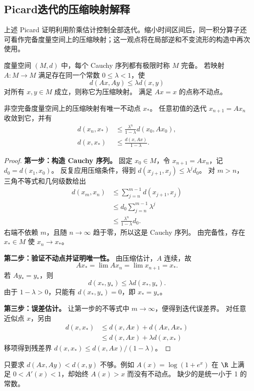 \subsection*{Picard迭代的压缩映射解释}
\label{sec:picard-contraction}
上述 Picard 证明利用阶乘估计控制全部迭代。缩小时间区间后，同一积分算子还可看作完备度量空间上的压缩映射；这一观点将在局部逆和不变流形的构造中再次使用。

\begin{definition}
度量空间 $(M,d)$ 中，每个 Cauchy 序列都有极限时称 $M$ 完备。
若映射 $A:M\to M$ 满足存在同一个常数 $0\leq\lambda<1$，使
\[
 d(Ax,Ay)\leq\lambda d(x,y)
\]
 对所有 $x,y\in M$ 成立，则称它为压缩映射。
满足 $Ax=x$ 的点称不动点。
\end{definition}
\begin{theorem}[压缩映射定理]\label{thm:arnold-banach}
非空完备度量空间上的压缩映射有唯一不动点 $x_*$。
任意初值的迭代 $x_{n+1}=Ax_n$ 收敛到它，并有
\[
 \begin{aligned}
 d(x_n,x_*)&\leq\frac{\lambda^n}{1-\lambda}d(x_0,Ax_0),\\
 d(x,x_*)&\leq\frac{d(x,Ax)}{1-\lambda}.
\end{aligned}
\]
\end{theorem}
\begin{proof}
\textbf{第一步：构造 Cauchy 序列。}
固定 $x_0\in M$，令 $x_{n+1}=Ax_n$，记 $d_0=d(x_1,x_0)$。
反复应用压缩条件，得到
$d(x_{j+1},x_j)\leq\lambda^jd_0$。
对 $m>n$，三角不等式和几何级数给出
\[
 \begin{aligned}
 d(x_m,x_n)&\leq\sum_{j=n}^{m-1}d(x_{j+1},x_j)\\
 &\leq d_0\sum_{j=n}^{m-1}\lambda^j\\
 &\leq\frac{\lambda^n}{1-\lambda}d_0.
\end{aligned}
\]
右端不依赖 $m$，且随 $n\to\infty$ 趋于零，所以这是 Cauchy 序列。
由完备性，存在 $x_*\in M$ 使 $x_n\to x_*$。

\textbf{第二步：验证不动点并证明唯一性。}
由压缩估计，$A$ 连续，故
\[
 Ax_*=\lim Ax_n=\lim x_{n+1}=x_*.
\]
若 $Ay_*=y_*$，则
\[
 d(x_*,y_*)\leq\lambda d(x_*,y_*).
\]
由于 $1-\lambda>0$，只能有 $d(x_*,y_*)=0$，即 $x_*=y_*$。

\textbf{第三步：误差估计。}
让第一步的不等式中 $m\to\infty$，便得到迭代误差界。
对任意近似点 $x$，另由
\[
 \begin{aligned}
 d(x,x_*)&\leq d(x,Ax)+d(Ax,Ax_*)\\
 &\leq d(x,Ax)+\lambda d(x,x_*)
\end{aligned}
\]
移项得到残差界 $d(x,x_*)\leq d(x,Ax)/(1-\lambda)$。
\end{proof}
只要求 $d(Ax,Ay)<d(x,y)$ 不够。例如
$A(x)=\log(1+e^x)$ 在 $\R$ 上满足 $0<A'(x)<1$，却始终 $A(x)>x$ 而没有不动点。
缺少的是统一小于 1 的常数。

